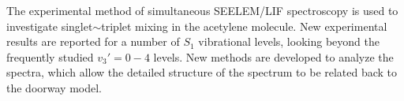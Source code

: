 



The experimental method of simultaneous SEELEM/LIF spectroscopy is
used to investigate singlet$\sim$triplet mixing in the acetylene
molecule.  New experimental results are reported for a number of $S_1$
vibrational levels, looking beyond the frequently studied $v_3'=0-4$
levels.  New methods are developed to analyze the spectra, which allow
the detailed structure of the spectrum to be related back to the
doorway model.

